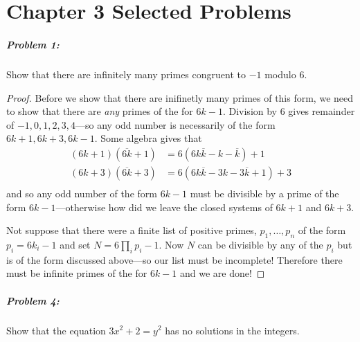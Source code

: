\chapter*{Chapter 3 Selected Problems}

\paragraph{Problem 1:} Show that there are infinitely many primes congruent to
\(-1\) modulo \(6\).

\begin{proof}
  Before we show that there are inifinetly many primes of this form, we need to
  show that there are \emph{any} primes of the for \(6k-1\).
  Division by 6 gives remainder of \(-1,0,1,2,3,4\)---so any odd number is
  necessarily of the form \(6k+1, 6k+3, 6k-1\). Some algebra gives that
  \begin{align*}
    (6k+1)(\overline{6k}+1) &= 6(6k \overline{k}-k-\overline{k})+1 \\
    (6k+3)(\overline{6k}+3) &= 6(6k \overline{k}-3k-3\overline{k}+1)+3 \\
  \end{align*}
  and so any odd number of the form \(6k-1\) must be divisible by a prime of the
  form \(6k-1\)---otherwise how did we leave the closed systems of \(6k+1\) and
  \(6k+3\).

  Not suppose that there were a finite list of positive primes, \(p_1, \dots ,p_n\) of
  the form \(p_i=6k_i-1\) and set \(N= 6 \prod_i p_i -1\). Now \(N\) can be
  divisible by any of the \(p_i\) but is of the form discussed above---so our list
  must be incomplete! Therefore there must be infinite primes of the for
  \(6k-1\) and we are done!
\end{proof}

\paragraph{Problem 4:} Show that the equation \(3x^2+2 = y^2\) has no solutions
in the integers.

